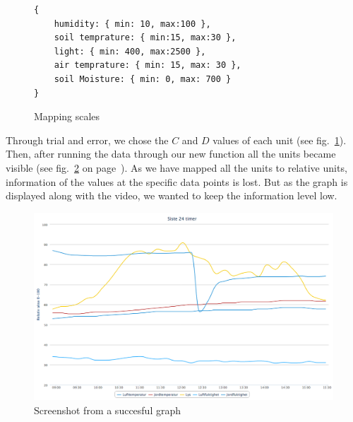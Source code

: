 

\begin{figure}
	\begin{lstlisting}[style=htmlcssjs]
{
	humidity: { min: 10, max:100 },
	soil temprature: { min:15, max:30 },
	light: { min: 400, max:2500 },
	air temprature: { min: 15, max: 30 },
	soil Moisture: { min: 0, max: 700 }
}
	\end{lstlisting}
	\caption{Mapping scales}
	\label{fig:mapscale}
\end{figure}

Through trial and error, we chose the \ensuremath{C} and \ensuremath{D} values of each unit (see fig.~\ref{fig:mapscale}). Then, after running the data through our new function all the units became visible (see fig.~\ref{fig:goodgraph} on page~\pageref{fig:goodgraph}). As we have mapped all the units to relative units, information of the values at the specific data points is lost. But as the graph is displayed along with the video, we wanted to keep the information level low.  

\begin{figure}
\centering
\includegraphics[width=1\textwidth]{img/interface/goodgraph.png}
\caption{Screenshot from a succesful graph}
\label{fig:goodgraph}
\end{figure}


